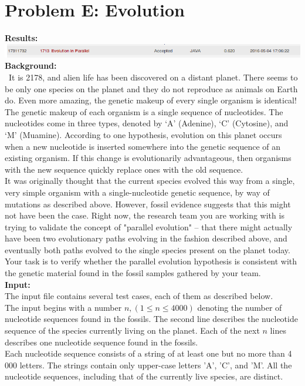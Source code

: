 \documentclass[12pt]{article}
\begin{document}
\section{Problem E: Evolution}
\noindent \textbf{Results:} \\

\includegraphics[width=\textwidth]{ProblemE} \\

\noindent \textbf{Background:} \\
~\indent  It is 2178, and alien life has been discovered on a distant planet. There seems to be only one species on
the planet and they do not reproduce as animals on Earth do. Even more amazing, the genetic makeup of every single
organism is identical! \\
\indent The genetic makeup of each organism is a single sequence of nucleotides. The nucleotides come in
three types, denoted by `A' (Adenine), `C' (Cytosine), and `M' (Muamine). According to one hypothesis,
evolution on this planet occurs when a new nucleotide is inserted somewhere into the genetic sequence
of an existing organism. If this change is evolutionarily advantageous, then organisms with the new
sequence quickly replace ones with the old sequence. \\
\indent It was originally thought that the current species evolved this way from a single, very simple
organism with a single-nucleotide genetic sequence, by way of mutations as described above. However,
fossil evidence suggests that this might not have been the case. Right now, the research team you are
working with is trying to validate the concept of "parallel evolution" -- that there might actually have
been two evolutionary paths evolving in the fashion described above, and eventually both paths evolved
to the single species present on the planet today. Your task is to verify whether the parallel evolution
hypothesis is consistent with the genetic material found in the fossil samples gathered by your team. \\

\noindent \textbf{Input:} \\
The input file contains several test cases, each of them as described below. \\
\indent The input begins with a number $n, (1 \leq n \leq 4000)$ denoting the number of nucleotide sequences
found in the fossils. The second line describes the nucleotide sequence of the species currently living
on the planet. Each of the next $n$ lines describes one nucleotide sequence found in the fossils. \\
\indent Each nucleotide sequence consists of a string of at least one but no more than 4 000 letters. The
strings contain only upper-case letters 'A', 'C', and 'M'. All the nucleotide sequences, including that of
the currently live species, are distinct. \\
\end{document}
